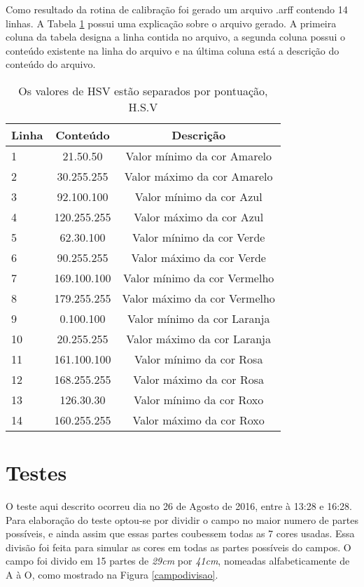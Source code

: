 Como resultado da rotina de calibração foi gerado um arquivo .arff contendo 14 linhas. A Tabela \ref{tab:arquivo} possui uma explicação sobre o arquivo gerado. A primeira coluna da tabela designa a linha contida no arquivo, a segunda coluna possui o conteúdo existente na linha do arquivo e na última coluna está a descrição do conteúdo do arquivo.
	\begin{table}[H]
\centering 
\begin{tabular}{l|c|c}
Linha & Conteúdo & Descrição  \\%
\hline                               %
 1& 21.50.50  &   Valor mínimo da cor Amarelo \\ \hline  
2& 30.255.255  &  Valor máximo da cor Amarelo \\  \hline 
3& 92.100.100  &   Valor mínimo da cor Azul \\  \hline 
4& 120.255.255  &  Valor máximo da cor  Azul \\  \hline 
5& 62.30.100 &  Valor mínimo da cor Verde \\  \hline 
6& 90.255.255  &  Valor máximo da cor Verde \\  \hline 
7& 169.100.100  &  Valor mínimo da cor Vermelho \\  \hline 
8& 179.255.255  &  Valor máximo da cor Vermelho \\   \hline 
9& 0.100.100  &  Valor mínimo da cor Laranja \\  \hline 
10& 20.255.255 &  Valor máximo da cor  Laranja \\  \hline 
11& 161.100.100 &  Valor mínimo da cor Rosa \\  \hline 
12& 168.255.255 &   Valor máximo da cor Rosa \\  \hline 
13& 126.30.30 &  Valor mínimo da cor Roxo \\  \hline 
14& 160.255.255 &  Valor máximo da cor Roxo \\  \hline 

\end{tabular}
\caption{Os valores de HSV estão separados por pontuação, H.S.V}
\label{tab:arquivo}
\end{table}





 \section{Testes}
O teste aqui descrito ocorreu dia no 26 de Agosto de 2016, entre à 13:28 e 16:28.
Para elaboração do teste optou-se por dividir o campo no maior numero de partes possíveis, e ainda assim que essas partes coubessem todas as 7 cores usadas. Essa divisão foi feita para simular as cores em todas as partes possíveis do campos. O campo foi divido em 15 partes de \textit{29cm} por \textit{41cm}, nomeadas alfabeticamente de A à O, como mostrado na Figura \ref{campodivisao}.

